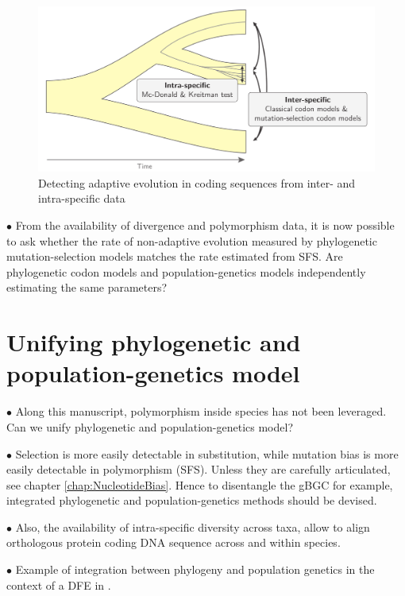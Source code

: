 \begin{figure}[H]
	\centering
	\includegraphics[width=\textwidth] {figures/inter-intra}
	\caption{Detecting adaptive evolution in coding sequences from inter- and intra-specific data}
\end{figure}

$\bullet$ From the availability of divergence and polymorphism data, it is now possible to ask whether the rate of non-adaptive evolution measured by phylogenetic mutation-selection models matches the rate estimated from \acrshort{SFS}.
Are phylogenetic \gls{codon} models and population-genetics models independently estimating the same parameters?

\section{Unifying phylogenetic and population-genetics model}
\label{sec:unifying-phylogenetic-and-population-genetics-model}

$\bullet$ Along this manuscript, polymorphism inside species has not been leveraged. Can we unify phylogenetic and population-genetics model?

$\bullet$ Selection is more easily detectable in \gls{substitution}, while mutation bias is more easily detectable in polymorphism (\acrshort{SFS}).
Unless they are carefully articulated, see chapter \ref{chap:NucleotideBias}.
Hence to disentangle the gBGC for example, integrated phylogenetic and population-genetics methods should be devised.

$\bullet$ Also, the availability of intra-specific diversity across taxa, allow to align orthologous protein coding \acrshort{DNA} sequence across and within species.

$\bullet$ Example of integration between phylogeny and population genetics in the context of a \acrshort{DFE} in \citet{Wilson2011}.

